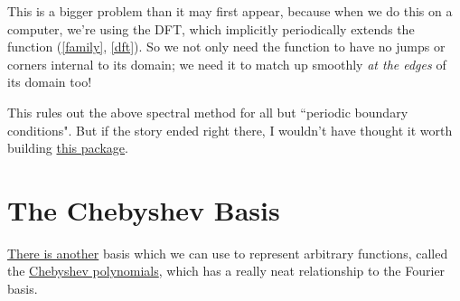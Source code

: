\documentclass[10pt]{article}
\begin{document}
This is a bigger problem than it may first appear, because when we do this on a computer, we're using the DFT, which implicitly periodically extends the function (\autoref{family}, \autoref{dft}). So we not only need the function to have no jumps or corners internal to its domain; we need it to match up smoothly \textit{at the edges} of its domain too!

This rules out the above spectral method for all but ``periodic boundary conditions"\cite{kutz}. But if the story ended right there, I wouldn't have thought it worth building \href{https://pypi.org/project/spectral-derivatives/}{this package}.

\section{The Chebyshev Basis}

\href{https://www.youtube.com/watch?v=HloOBYPwlmU}{There is another} basis which we can use to represent arbitrary functions, called the \href{https://epubs.siam.org/doi/epdf/10.1137/1.9780898719598.ch8}{Chebyshev polynomials}\cite{trefethen8}, which has a really neat relationship to the Fourier basis.
\end{document}
